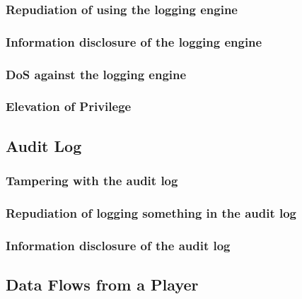 \documentclass[a4paper,11pt]{report}
\begin{document}
\subsubsection{Repudiation of using the logging engine}
\subsubsection{Information disclosure of the logging engine}
\subsubsection{DoS against the logging engine}
\subsubsection{Elevation of Privilege}
\subsection{Audit Log}
\subsubsection{Tampering with the audit log}
\subsubsection{Repudiation of logging something in the audit log}
\subsubsection{Information disclosure of the audit log}

\subsection{Data Flows from a Player}
\end{document}
